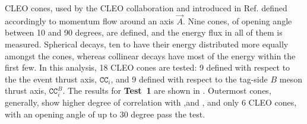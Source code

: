 CLEO cones, used by the CLEO collaboration and introduced in Ref.\cite{CLEO:1995rok} defined accordingly to momentum flow around an axis $\vec{A}$.
Nine cones, of opening angle between 10 and 90 degrees, are defined, and the energy flux in all of them is measured.
Spherical decays, ten to have their energy distributed more equally amongst the cones, whereas collinear decays have most of the energy within the first few.
In this analysis, 18 CLEO cones are tested: 9 defined with respect to the the event thrust axis, $\mathtt{CC}_{i}$, and 9 defined with respect to the tag-side $B$ meson thrust axis, $\mathtt{CC}^B_{i}$.
The results for \textbf{Test~1} are shown in .
Outermost cones, generally, show higher degree of correlation with \EB,\Estar and \Mbc, and only 6 CLEO cones, with an opening angle of up to 30 degree pass the test.

